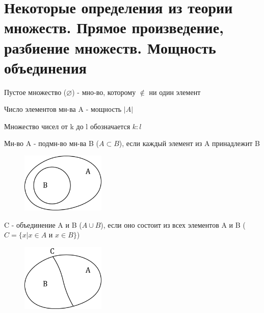 \documentclass[discrete.tex]{subfiles}
\begin{document}
  \section{Некоторые определения из теории множеств. Прямое произведение, разбиение множеств. Мощность объединения}

  \begin{definition}
    Пустое множество ($\varnothing$) - мно-во, которому $\nin$ ни один элемент
  \end{definition}

  \begin{definition}
    Число элементов мн-ва A - мощность $|A|$
  \end{definition}

  \begin{definition}
    Множество чисел от k до l обозначается $k:l$
  \end{definition}

  \begin{definition}
    Мн-во A - подмн-во мн-ва B ($A \subset B$), если каждый элемент из A принадлежит B
    \begin{figure}[H]
        \includegraphics[width=4cm]{pics/1_1.png}
        \centering
    \end{figure}
  \end{definition}

  \begin{definition}
    C - объединение A и B ($A \cup B$), если оно состоит из всех элементов A и B ($C = \{x | x \in A \text{ и } x \in B\}$)
    \begin{figure}[H]
        \includegraphics[width=4cm]{pics/1_2.png}
        \centering
    \end{figure}
  \end{definition}
\end{document}
